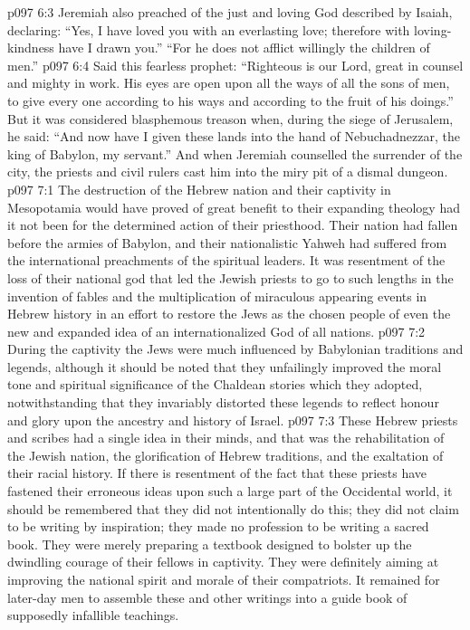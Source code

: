 \vs p097 6:3 Jeremiah also preached of the just and loving God described by Isaiah, declaring: “Yes, I have loved you with an everlasting love; therefore with loving\hyp{}kindness have I drawn you.” “For he does not afflict willingly the children of men.”
\vs p097 6:4 Said this fearless prophet: “Righteous is our Lord, great in counsel and mighty in work. His eyes are open upon all the ways of all the sons of men, to give every one according to his ways and according to the fruit of his doings.” But it was considered blasphemous treason when, during the siege of Jerusalem, he said: “And now have I given these lands into the hand of Nebuchadnezzar, the king of Babylon, my servant.” And when Jeremiah counselled the surrender of the city, the priests and civil rulers cast him into the miry pit of a dismal dungeon.
\vs p097 7:1 The destruction of the Hebrew nation and their captivity in Mesopotamia would have proved of great benefit to their expanding theology had it not been for the determined action of their priesthood. Their nation had fallen before the armies of Babylon, and their nationalistic Yahweh had suffered from the international preachments of the spiritual leaders. It was resentment of the loss of their national god that led the Jewish priests to go to such lengths in the invention of fables and the multiplication of miraculous appearing events in Hebrew history in an effort to restore the Jews as the chosen people of even the new and expanded idea of an internationalized God of all nations.
\vs p097 7:2 During the captivity the Jews were much influenced by Babylonian traditions and legends, although it should be noted that they unfailingly improved the moral tone and spiritual significance of the Chaldean stories which they adopted, notwithstanding that they invariably distorted these legends to reflect honour and glory upon the ancestry and history of Israel.
\vs p097 7:3 These Hebrew priests and scribes had a single idea in their minds, and that was the rehabilitation of the Jewish nation, the glorification of Hebrew traditions, and the exaltation of their racial history. If there is resentment of the fact that these priests have fastened their erroneous ideas upon such a large part of the Occidental world, it should be remembered that they did not intentionally do this; they did not claim to be writing by inspiration; they made no profession to be writing a sacred book. They were merely preparing a textbook designed to bolster up the dwindling courage of their fellows in captivity. They were definitely aiming at improving the national spirit and morale of their compatriots. It remained for later\hyp{}day men to assemble these and other writings into a guide book of supposedly infallible teachings.
